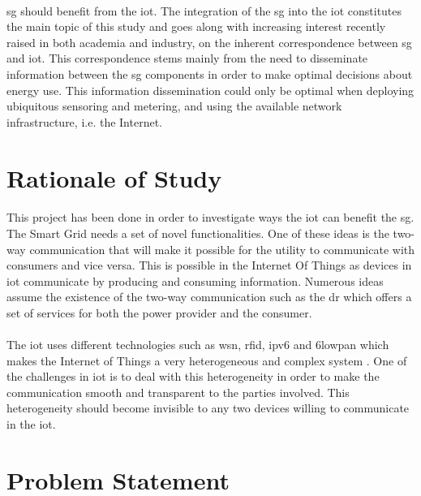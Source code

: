 \documentclass[oneside,12pt,a4paper,final]{book}
\begin{document}
\paragraph{}
\gls{sg} should benefit from the \gls{iot}. The integration of the \gls{sg} into the \gls{iot} constitutes the main topic of this study and goes along with increasing interest recently raised in both academia and industry, on the inherent correspondence between \gls{sg} and \gls{iot}. This  correspondence stems mainly from the need to disseminate information between the \gls{sg} components in order to make optimal decisions about energy use. This information dissemination could only be optimal when deploying ubiquitous sensoring and metering, and using the available network infrastructure, i.e. the Internet.   


\section{Rationale of Study}
\paragraph{}
This project has been done in order to investigate ways the \gls{iot} can benefit the \gls{sg}. The Smart Grid needs a set of novel functionalities. One of these ideas is the two-way communication that will make it possible for the utility to communicate with consumers and vice versa. This is possible in the Internet Of Things as devices in \gls{iot} communicate by producing and consuming information. Numerous ideas assume the existence of the two-way communication such as the \gls{dr} which offers a set of services for both the power provider and the consumer.
\paragraph{}
The \gls{iot} uses different technologies such as \gls{wsn}, \gls{rfid}, \gls{ipv6} and \gls{6lowpan} which makes the Internet of Things a very heterogeneous and complex system \cite{ref4}. One of the challenges in \gls{iot} is to deal with this heterogeneity in order to make the communication smooth and transparent to the parties involved. This heterogeneity should become invisible to any two devices willing to communicate in the \gls{iot}.

\section{Problem Statement}
\end{document}
